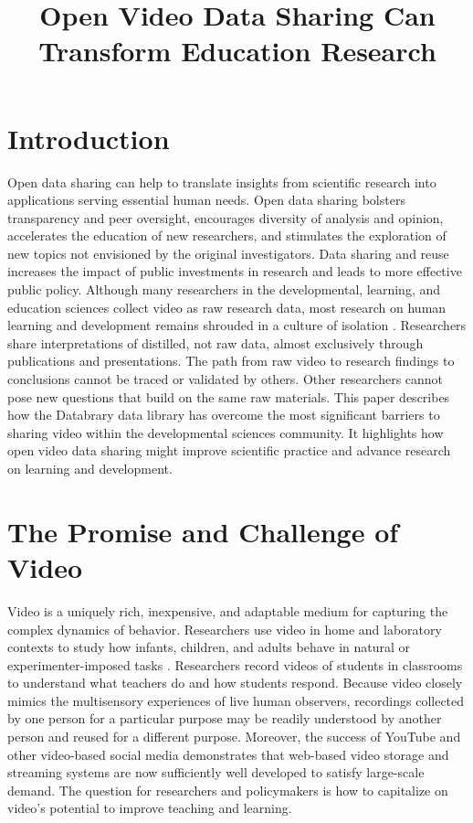 \documentclass[letterpaper,man,apacite]{apa6}
\title{Open Video Data Sharing Can Transform Education Research}
\begin{document}
\maketitle

\section{Introduction}
Open data sharing can help to translate insights from scientific research into applications serving essential human needs. 
Open data sharing bolsters transparency and peer oversight, encourages diversity of analysis and opinion, accelerates the education of new researchers, and stimulates the exploration of new topics not envisioned by the original investigators. 
Data sharing and reuse increases the impact of public investments in research and leads to more effective public policy. 
Although many researchers in the developmental, learning, and education sciences collect video as raw research data, most research on human learning and development remains shrouded in a culture of isolation \cite{Adolph2012}. 
Researchers share interpretations of distilled, not raw data, almost exclusively through publications and presentations. 
The path from raw video to research findings to conclusions cannot be traced or validated by others.
Other researchers cannot pose new questions that build on the same raw materials. 
This paper describes how the Databrary data library has overcome the most significant barriers to sharing video within the developmental sciences community.
It highlights how open video data sharing might improve scientific practice and advance research on learning and development. 

\section{The Promise and Challenge of Video}
Video is a uniquely rich, inexpensive, and adaptable medium for capturing the complex dynamics of behavior. 
Researchers use video in home and laboratory contexts to study how infants, children, and adults behave in natural or experimenter-imposed tasks \cite{Karasik2014}. 
Researchers record videos of students in classrooms \cite{Alibali2012} to understand what teachers do and how students respond. 
Because video closely mimics the multisensory experiences of live human observers, recordings collected by one person for a particular purpose may be readily understood by another person and reused for a different purpose. 
Moreover, the success of YouTube and other video-based social media demonstrates that web-based video storage and streaming systems are now sufficiently well developed to satisfy large-scale demand. 
The question for researchers and policymakers is how to capitalize on video's potential to improve teaching and learning.
\end{document}
